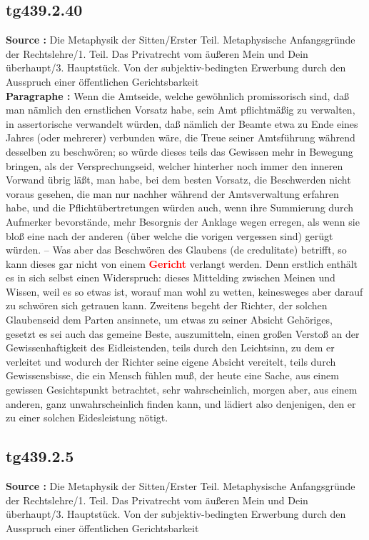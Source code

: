 \documentclass[a4paper,12pt,twoside]{book}
\newcommand{\match}[1]{\textcolor{red}{\textbf{#1}}}
\begin{document}
	\subsection*{tg439.2.40} 
	\textbf{Source : }Die Metaphysik der Sitten/Erster Teil. Metaphysische Anfangsgründe der Rechtslehre/1. Teil. Das Privatrecht vom äußeren Mein und Dein überhaupt/3. Hauptstück. Von der subjektiv-bedingten Erwerbung durch den Ausspruch einer öffentlichen Gerichtsbarkeit\\  
	
	\textbf{Paragraphe : }Wenn die Amtseide, welche gewöhnlich promissorisch sind, daß man nämlich den ernstlichen Vorsatz habe, sein Amt pflichtmäßig zu verwalten, in assertorische verwandelt würden, daß nämlich der Beamte etwa zu Ende eines Jahres (oder mehrerer) verbunden  wäre, die Treue seiner Amtsführung während desselben zu beschwören; so würde dieses teils das Gewissen mehr in Bewegung bringen, als der Versprechungseid, welcher hinterher noch immer den inneren Vorwand übrig läßt, man habe, bei dem besten Vorsatz, die Beschwerden nicht voraus gesehen, die man nur nachher während der Amtsverwaltung erfahren habe, und die Pflichtübertretungen würden auch, wenn ihre Summierung durch Aufmerker bevorstände, mehr Besorgnis der Anklage wegen erregen, als wenn sie bloß eine nach der anderen (über welche die vorigen vergessen sind) gerügt würden. – Was aber das Beschwören des Glaubens (de credulitate) betrifft, so kann dieses gar nicht von einem \match{Gericht} verlangt werden. Denn erstlich enthält es in sich selbst einen Widerspruch: dieses Mittelding zwischen Meinen und Wissen, weil es so etwas ist, worauf man wohl zu wetten, keinesweges aber darauf zu schwören sich getrauen kann. Zweitens begeht der Richter, der solchen Glaubenseid dem Parten ansinnete, um etwas zu seiner Absicht Gehöriges, gesetzt es sei auch das gemeine Beste, auszumitteln, einen großen Verstoß an der Gewissenhaftigkeit des Eidleistenden, teils durch den Leichtsinn, zu dem er verleitet und wodurch der Richter seine eigene Absicht vereitelt, teils durch Gewissensbisse, die ein Mensch fühlen muß, der heute eine Sache, aus einem gewissen Gesichtspunkt betrachtet, sehr wahrscheinlich, morgen aber, aus einem anderen, ganz unwahrscheinlich finden kann, und lädiert also denjenigen, den er zu einer solchen Eidesleistung nötigt. 
	
	\subsection*{tg439.2.5} 
	\textbf{Source : }Die Metaphysik der Sitten/Erster Teil. Metaphysische Anfangsgründe der Rechtslehre/1. Teil. Das Privatrecht vom äußeren Mein und Dein überhaupt/3. Hauptstück. Von der subjektiv-bedingten Erwerbung durch den Ausspruch einer öffentlichen Gerichtsbarkeit\\  
	
\end{document}
